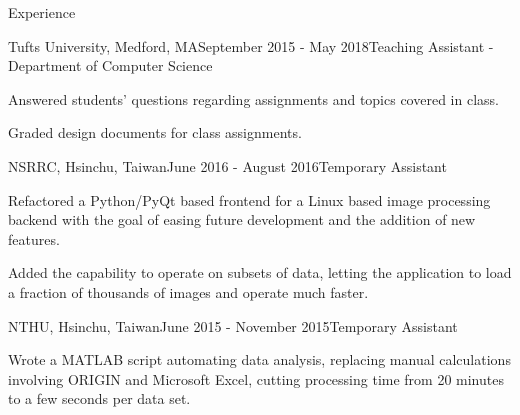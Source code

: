 \documentclass{resume} %
\begin{document}
\begin{rSection}{Experience}


\begin{rSubsection}{Tufts University, Medford, MA}{September 2015 -
    May 2018}{Teaching Assistant - Department of Computer Science}

\item Answered students' questions regarding assignments and topics covered in
    class.

\item Graded design documents for class assignments.

\end{rSubsection}

\begin{rSubsection}{NSRRC, Hsinchu, Taiwan}{June 2016 - August 2016}{Temporary
    Assistant}

\item Refactored a Python/PyQt based frontend for a Linux based image
    processing backend with the goal of easing future development and the
    addition of new features.

\item Added the capability to operate on subsets of data, letting the
    application to load a fraction of thousands of images and operate much
    faster.

\end{rSubsection}

\begin{rSubsection}{NTHU, Hsinchu, Taiwan}{June 2015 - November
    2015}{Temporary Assistant}

\item Wrote a MATLAB script automating data analysis, replacing manual
    calculations involving ORIGIN and Microsoft Excel, cutting processing time
    from 20 minutes to a few seconds per data set.

\end{rSubsection}

\smallskip

\end{rSection}

\end{document}
